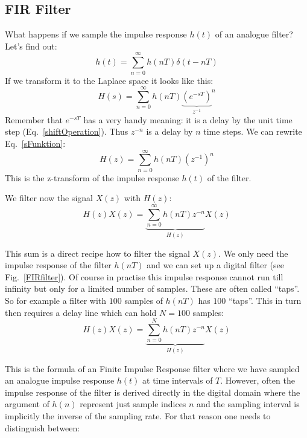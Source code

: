 \documentclass[12pt,a4paper]{article}
\begin{document}
\subsection{FIR Filter}
What happens if we sample the impulse response $h(t)$ of an
analogue filter? Let's find out:
\begin{equation}
\label{sampltime}
h(t)=\sum_{n=0}^\infty h(nT) \delta(t-nT)
\end{equation}
If we transform it to the Laplace space it looks like this:
\begin{equation}
\label{sFunktion}
H(s)=\sum_{n=0}^\infty h(nT) {\underbrace{{\left(e^{-sT}\right)}}_
                                           {z^{-1}}}^n
\end{equation}
Remember that $e^{-sT}$ has a very handy meaning: it is a delay
by the unit time step (Eq.~\ref{shiftOperation}).
Thus $z^{-n}$ is a delay by $n$ time steps.
We can rewrite Eq.~\ref{sFunktion}:
\begin{equation}
H(z)=\sum_{n=0}^\infty h(nT) {(z^{-1})}^n \label{ztrans}
\end{equation}
This is the z-transform of the impulse response $h(t)$ of the filter.

We filter now the signal $X(z)$ with $H(z)$:
\begin{equation}
H(z)X(z)=\underbrace{\sum_{n=0}^\infty h(nT) z^{-n}}_{H(z)} X(z) \label{notFIRyet}
\end{equation}

This sum is a direct recipe how to filter the signal $X(z)$. We only
need the impulse response of the filter $h(nT)$ and we can
set up a digital filter (see Fig.~\ref{FIRfilter}). Of course
in practise this impulse response cannot run till infinity
but only for a limited number of samples. These are often
called ``taps''. So for example a filter with $100$ samples of $h(nT)$ has
$100$ ``taps''. This in turn then requires a delay line which
can hold $N=100$ samples:
\begin{equation}
\label{FIRz}
H(z)X(z)=\underbrace{\sum_{n=0}^N h(nT) z^{-n}}_{H(z)} X(z) \label{FIRfromAnalogue}
\end{equation}

This is the formula of an Finite Impulse Response filter where we have
sampled an analogue impulse response $h(t)$ at time intervals of $T$.
However, often the impulse response of the filter is derived directly
in the digital domain where the argument of $h(n)$ represent just sample
indices $n$ and the sampling interval is implicitly the inverse of the sampling
rate. For that reason one needs to distinguish between:
\end{document}
